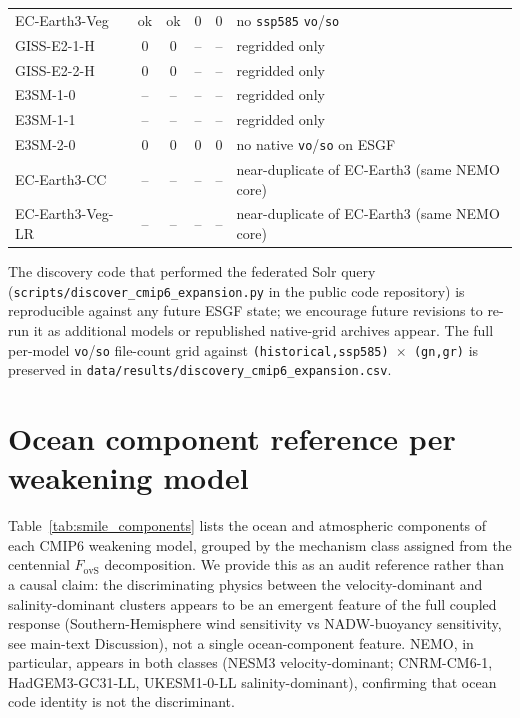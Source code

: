 \documentclass[10pt,a4paper]{article}
\newcommand{\Fovs}{F_{\mathrm{ovS}}}
\begin{document}
\begin{table}[h]
\begin{tabular}{l c c c c l}
EC-Earth3-Veg     & ok  & ok  & 0   & 0   & no \texttt{ssp585} \texttt{vo}/\texttt{so} \\
GISS-E2-1-H       & 0   & 0   & --  & --  & regridded only \\
GISS-E2-2-H       & 0   & 0   & --  & --  & regridded only \\
E3SM-1-0          & --  & --  & --  & --  & regridded only \\
E3SM-1-1          & --  & --  & --  & --  & regridded only \\
E3SM-2-0          & 0   & 0   & 0   & 0   & no native \texttt{vo}/\texttt{so} on ESGF \\
EC-Earth3-CC      & --  & --  & --  & --  & near-duplicate of EC-Earth3 (same NEMO core) \\
EC-Earth3-Veg-LR  & --  & --  & --  & --  & near-duplicate of EC-Earth3 (same NEMO core) \\
\bottomrule
\end{tabular}
\end{table}

The discovery code that performed the federated Solr query
(\texttt{scripts/discover\_cmip6\_expansion.py} in the public code
repository) is reproducible against any future ESGF state; we
encourage future revisions to re-run it as additional models or
republished native-grid archives appear. The full per-model
\texttt{vo}/\texttt{so} file-count grid against
\texttt{(historical,ssp585)\,$\times$\,(gn,gr)} is preserved in
\texttt{data/results/discovery\_cmip6\_expansion.csv}.

\section*{Ocean component reference per weakening model}
\label{si:components}

Table~\ref{tab:smile_components} lists the ocean and atmospheric components
of each CMIP6 weakening model, grouped by the mechanism class assigned
from the centennial $\Fovs$ decomposition. We provide this as an audit
reference rather than a causal claim: the discriminating physics between
the velocity-dominant and salinity-dominant clusters appears to be an
emergent feature of the full coupled response (Southern-Hemisphere wind
sensitivity vs NADW-buoyancy sensitivity, see main-text Discussion), not
a single ocean-component feature. NEMO, in particular, appears in both
classes (NESM3 velocity-dominant; CNRM-CM6-1, HadGEM3-GC31-LL,
UKESM1-0-LL salinity-dominant), confirming that ocean code identity is
not the discriminant.
\end{document}
